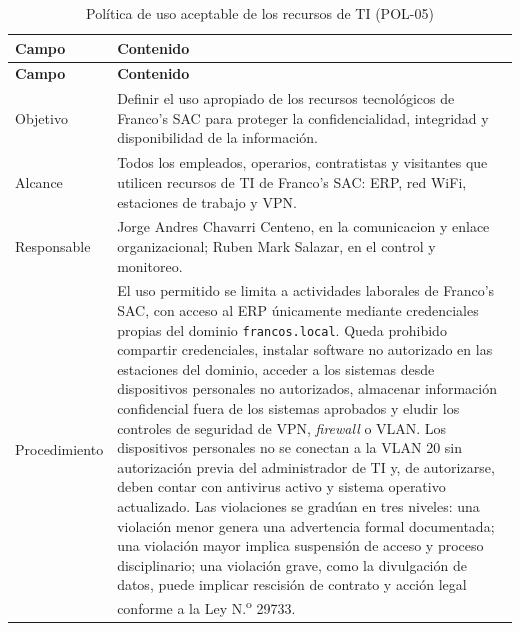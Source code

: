 \documentclass[11pt, a4paper, oneside]{report}
\begin{document}
\begin{xltabular}{\textwidth}{@{}|L{2.6cm}|X|@{}}
\caption{Política de uso aceptable de los recursos de TI (POL-05)}
\label{tab:pol05_uso_aceptable} \\

\parbox[c][1.1cm][c]{\linewidth}{\centering\color{white}\bfseries\small Campo} &
\parbox[c][1.1cm][c]{\linewidth}{\centering\color{white}\bfseries\small Contenido} \\ \hline
\endfirsthead

\parbox[c][1.1cm][c]{\linewidth}{\centering\color{white}\bfseries\small Campo} &
\parbox[c][1.1cm][c]{\linewidth}{\centering\color{white}\bfseries\small Contenido} \\ \hline
\endhead

\hline
\endfoot

{\small Objetivo} & {\small Definir el uso apropiado de los recursos tecnológicos de Franco's SAC para proteger la confidencialidad, integridad y disponibilidad de la información.} \\ \hline

{\small Alcance} & {\small Todos los empleados, operarios, contratistas y visitantes que utilicen recursos de TI de Franco's SAC: ERP, red WiFi, estaciones de trabajo y VPN.} \\ \hline

{\small Responsable} & {\small Jorge Andres Chavarri Centeno, en la comunicacion y enlace organizacional; Ruben Mark Salazar, en el control y monitoreo.} \\ \hline

{\small Procedimiento} & {\small El uso permitido se limita a actividades laborales de Franco's SAC, con acceso al ERP únicamente mediante credenciales propias del dominio \texttt{francos.local}. Queda prohibido compartir credenciales, instalar software no autorizado en las estaciones del dominio, acceder a los sistemas desde dispositivos personales no autorizados, almacenar información confidencial fuera de los sistemas aprobados y eludir los controles de seguridad de VPN, \textit{firewall} o VLAN. Los dispositivos personales no se conectan a la VLAN 20 sin autorización previa del administrador de TI y, de autorizarse, deben contar con antivirus activo y sistema operativo actualizado. Las violaciones se gradúan en tres niveles: una violación menor genera una advertencia formal documentada; una violación mayor implica suspensión de acceso y proceso disciplinario; una violación grave, como la divulgación de datos, puede implicar rescisión de contrato y acción legal conforme a la Ley N.\textsuperscript{o} 29733.} \\ \hline


\end{xltabular}
\end{document}
